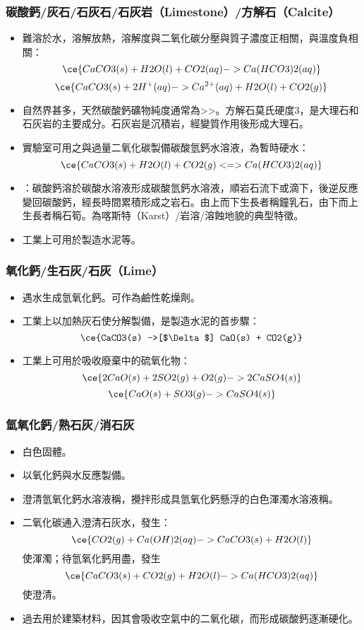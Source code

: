 \documentclass[a4paper,12pt]{report}
\begin{document}
\begin{itemize}
\begin{itemize}
\subsubsection{碳酸鈣/灰石/石灰石/石灰岩（Limestone）/方解石（Calcite）}
\begin{itemize}
\item 難溶於水，溶解放熱，溶解度與二氧化碳分壓與質子濃度正相關，與溫度負相關：
\[\ce{CaCO3(s) + H2O(l) + CO2(aq) -> Ca(HCO3)2(aq)}\]
\[\ce{CaCO3(s) + 2H^+(aq) -> Ca^{2+}(aq) + H2O(l) + CO2(g)}\]
\item 自然界甚多，天然碳酸鈣礦物純度通常為>>。方解石莫氏硬度3，是大理石和石灰岩的主要成分。石灰岩是沉積岩，經變質作用後形成大理石。
\item 實驗室可用之與過量二氧化碳製備碳酸氫鈣水溶液，為暫時硬水：
\[\ce{CaCO3(s) + H2O(l) + CO2(g) <=> Ca(HCO3)2(aq)}\]
\item {}：碳酸鈣溶於碳酸水溶液形成碳酸氫鈣水溶液，順岩石流下或滴下，後逆反應變回碳酸鈣，經長時間累積形成之岩石。由上而下生長者稱鐘乳石，由下而上生長者稱石筍。為喀斯特（Karst）/岩溶/溶蝕地貌的典型特徵。
\item 工業上可用於製造水泥等。
\end{itemize}
\subsubsection{氧化鈣/生石灰/石灰（Lime）}
\begin{itemize}
\item 遇水生成氫氧化鈣。可作為鹼性乾燥劑。
\item 工業上以加熱灰石使分解製備，是製造水泥的首步驟：
\[\ce{CaCO3(s) ->[$\Delta$] CaO(s) + CO2(g)}\]
\item 工業上可用於吸收廢棄中的硫氧化物：
\[\ce{2CaO(s) + 2SO2(g) + O2(g) -> 2CaSO4(s)}\]
\[\ce{CaO(s) + SO3(g) -> CaSO4(s)}\]
\end{itemize}
\subsubsection{氫氧化鈣/熟石灰/消石灰}
\begin{itemize}
\item 白色固體。
\item 以氧化鈣與水反應製備。
\item 澄清氫氧化鈣水溶液稱，攪拌形成具氫氧化鈣懸浮的白色渾濁水溶液稱。
\item 二氧化碳通入澄清石灰水，發生：
\[\ce{CO2(g) + Ca(OH)2(aq) -> CaCO3(s) + H2O(l)}\]
使渾濁；待氫氧化鈣用盡，發生
\[\ce{CaCO3(s) + CO2(g) +H2O(l) -> Ca(HCO3)2(aq)}\]
使澄清。
\item 過去用於建築材料，因其會吸收空氣中的二氧化碳，而形成碳酸鈣逐漸硬化。
\end{itemize}

\end{itemize}
\end{itemize}
\end{document}

